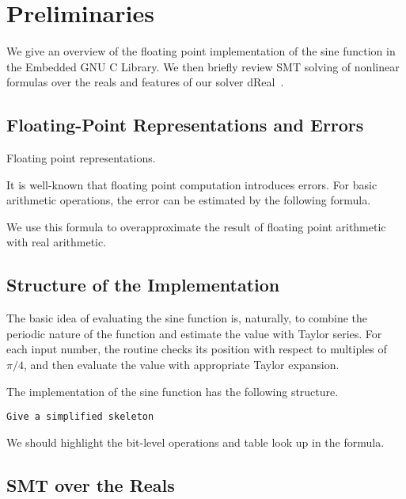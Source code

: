 \section{Preliminaries}

We give an overview of the floating point implementation of the sine function in the Embedded GNU C Library. We then briefly review SMT solving of nonlinear formulas over the reals and features of our solver dReal~\cite{}.

\subsection{Floating-Point Representations and Errors}

Floating point representations. 

It is well-known that floating point computation introduces errors. For basic arithmetic operations, the error can be estimated by the following formula. 

We use this formula to overapproximate the result of floating point arithmetic with real arithmetic. 

\subsection{Structure of the Implementation}

The basic idea of evaluating the sine function is, naturally, to combine the periodic nature of the function and estimate the value with Taylor series. For each input number, the routine checks its position with respect to multiples of $\pi/4$, and then evaluate the value with appropriate Taylor expansion. 

The implementation of the sine function has the following structure. 
\begin{verbatim}
Give a simplified skeleton
\end{verbatim}

We should highlight the bit-level operations and table look up in the formula. 

\subsection{SMT over the Reals}


